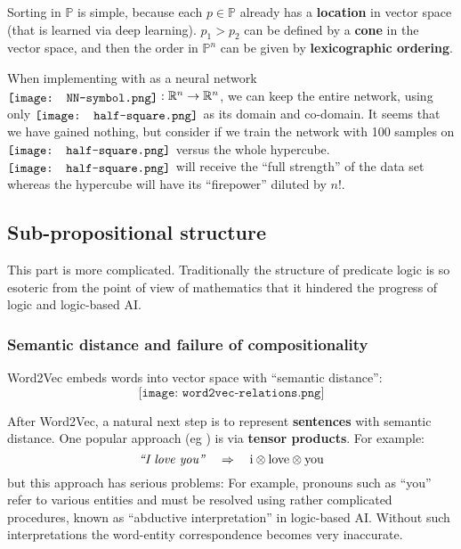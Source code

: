 \documentclass[orivec]{llncs}
\newcommand*\NN{\raisebox{-.2\height}{\texttt{[image: NN-symbol.png]}}}
\newcommand*\halfsquare{\raisebox{-.1\height}{\texttt{[image: half-square.png]}}}
\begin{document}
Sorting in $\mathbb{P}$ is simple, because each $p \in \mathbb{P}$ already has a \textbf{location} in vector space (that is learned via deep learning).  $p_1 > p_2$ can be defined by a \textbf{cone} in the vector space, and then the order in $\mathbb{P}^n$ can be given by \textbf{lexicographic ordering}.

When implementing with as a neural network $\NN: \mathbb{R}^n \rightarrow \mathbb{R}^n$, we can keep the entire network, using only $\halfsquare$ as its domain and co-domain.  It seems that we have gained nothing, but consider if we train the network with 100 samples on $\halfsquare$ versus the whole hypercube.  $\halfsquare$ will receive the ``full strength'' of the data set whereas the hypercube will have its ``firepower'' diluted by $n!$.


\subsection{Sub-propositional structure}

This part is more complicated.  Traditionally the structure of predicate logic is so esoteric from the point of view of mathematics that it hindered the progress of logic and logic-based AI.

\subsubsection{Semantic distance and failure of compositionality}

Word2Vec\cite{Mikolov2013} embeds words into vector space with ``semantic distance'':
\begin{equation}
\texttt{[image: word2vec-relations.png]}
\end{equation}

After Word2Vec, a natural next step is to represent \textbf{sentences} with semantic distance.    One popular approach (eg \cite{Coecke2010}) is via \textbf{tensor products}.  For example:
\begin{equation}
\mbox{\textit{``I love you''}} \quad \Rightarrow \quad \mbox{i} \otimes \mbox{love} \otimes \mbox{you}
\end{equation}
but this approach has serious problems:  For example, pronouns such as ``you'' refer to various entities and must be resolved using rather complicated procedures, known as ``abductive interpretation'' in logic-based AI.  Without such interpretations the word-entity correspondence becomes very inaccurate.
\end{document}

